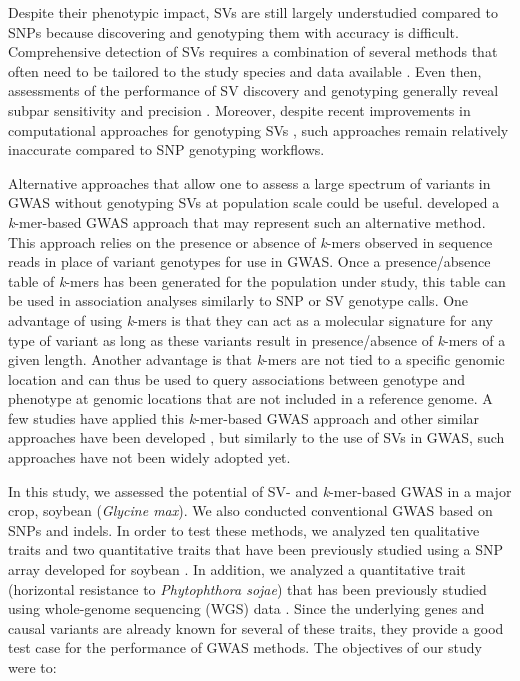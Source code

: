 Despite their phenotypic impact, SVs are still largely understudied compared to
SNPs because discovering and genotyping them with accuracy is difficult.
Comprehensive detection of SVs requires a combination of several methods that
often need to be tailored to the study species and data available
\citep{alkan2011, ho2020}. Even then, assessments of the performance of SV
discovery and genotyping generally reveal subpar sensitivity and precision
\citep[e.g.][]{cameron2019, chaisson2019, kosugi2019}. Moreover, despite recent
improvements in computational approaches for genotyping SVs
\citep[e.g.][]{siren2021, ebler2022}, such approaches remain relatively
inaccurate compared to SNP genotyping workflows.

Alternative approaches that allow one to assess a large spectrum
of variants in GWAS without genotyping SVs at population scale could be useful.
\cite{voichek2020} developed a \emph{k}-mer-based GWAS approach that may
represent such an alternative method. This approach relies on the presence or
absence of \emph{k}-mers observed in sequence reads in place of variant genotypes for use in
GWAS. Once a presence/absence table of \emph{k}-mers has been generated for the
population under study, this table can be used in association analyses
similarly to SNP or SV genotype calls. One advantage of using \emph{k}-mers is
that they can act as a molecular signature for any type of variant as long as
these variants result in presence/absence of \emph{k}-mers of a given length.
Another advantage is that \emph{k}-mers are not tied to a specific genomic
location and can thus be used to query associations between genotype and
phenotype at genomic locations that are not included in a reference genome.  A
few studies have applied this \emph{k}-mer-based GWAS approach
\citep[e.g.][]{tripodi2021, colque2021} and other similar approaches have been
developed \citep{rahman2018, he2021}, but similarly to the use of SVs in GWAS,
such approaches have not been widely adopted yet.

In this study, we assessed the potential of SV- and \emph{k}-mer-based GWAS in
a major crop, soybean (\emph{Glycine max}). We also conducted conventional GWAS
based on SNPs and indels. In order to test these methods, we analyzed ten
qualitative traits \citep{bandillo2017} and two quantitative traits
\citep{bandillo2015} that have been previously studied using a SNP array
developed for soybean \citep{song2013}. In addition, we analyzed a quantitative
trait (horizontal resistance to \emph{Phytophthora sojae}) that has been
previously studied using whole-genome sequencing (WGS) data
\citep{deronne2022}.  Since the underlying genes and causal variants are
already known for several of these traits, they provide a good test case for
the performance of GWAS methods.  The objectives of our study were to:

